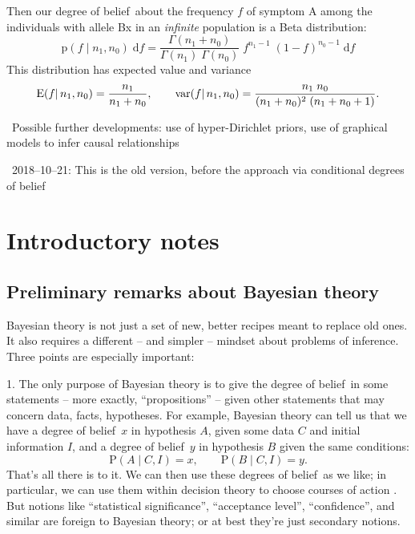 \documentclass[\ifafour a4paper,12pt,\else a5paper,10pt,\fi%
onecolumn,oneside,article,%
british%
]{memoir}
\theoremstyle{remark}
\theoremstyle{innote}
\newcommand*{\citep}{\parencites}
\newcommand*{\di}{\mathrm{d}}%
\newcommand*{\pf}{\mathrm{p}}%
\newcommand*{\p}{\mathrm{P}}%
\renewcommand*{\|}{\mathpunct{|}}
\newcommand*{\E}{\mathrm{E}}
\DeclarePairedDelimiter\expp{(}{)}
\newcommand*{\expe}{\E\expp}%
\newcommand*{\puzzle}{\maltese}
\newcommand{\mynote}[1]{ {\color{notecolour}\puzzle\ #1}}
\DeclareMathOperator{\var}{var}
\newcommand*{\dob}{degree of belief}
\newcommand*{\dobs}{degrees of belief}
\begin{document}
Then our \dob\ about the frequency $f$ of symptom A among the individuals with
allele Bx in an \emph{infinite} population is a Beta distribution:
\begin{equation}
  \label{eq:beta_fr}
\pf(f \| n_1,n_0)\;\di f = \frac{\Gamma(n_1+n_0)}{\Gamma(n_1)\;\Gamma(n_0)}
 \; f^{n_1-1}\;(1-f)^{n_0-1} \;\di f
\end{equation}
This distribution has expected value and variance
\begin{equation}
  \label{eq:exp_value}
  \expe{f \| n_1, n_0} = \frac{n_1}{n_1+n_0},
  \qquad
  \var(f \| n_1, n_0) = \frac{n_1\;n_0}{(n_1+n_0)^2\;(n_1+n_0+1)}.
\end{equation}







\mynote{Possible further developments: use of hyper-Dirichlet priors, use
  of graphical models to infer causal relationships
  \citep{pearl2000_r2009}}

\newpage
\renewcommand*{\appendixpagename}{Appendix}
\renewcommand*{\appendixname}{Appendix}


\mynote{2018--10--21: This is the old version, before the approach via conditional \dobs}

\section{Introductory notes}
\label{sec:pre_intro}


\subsection{Preliminary remarks about Bayesian  theory}
\label{sec:pre_prelim_remarks}

Bayesian  theory is not just a set of new, better recipes meant
to replace old ones. It also requires a different -- and simpler -- mindset
about problems of inference. Three points are especially important:

1. The only purpose of Bayesian theory is to give the \dob\ in some
statements -- more exactly, \enquote{propositions}
\citep{copietal1953_r2014,barwiseetal1999_r2003} -- given other statements
that may concern data, facts, hypotheses. For example, Bayesian theory can
tell us that we have a \dob\ $x$ in hypothesis $A$, given some data $C$ and
initial information $I$, and a \dob\ $y$ in hypothesis $B$ given the same
conditions:
\begin{equation*}
  \p(A \| C, I ) = x, \qquad   \p(B \| C, I ) = y.
\end{equation*}
That's all there is to it. We can then use these \dobs\ as we like; in
particular, we can use them within decision theory to choose courses of
action \citep{raiffaetal1961_r2000,prattetal1995_r1996,soxetal1988_r2013}.
But notions like \enquote{statistical significance}, \enquote{acceptance
  level}, \enquote{confidence}, and similar are foreign to Bayesian theory;
or at best they're just secondary notions.
\end{document}
